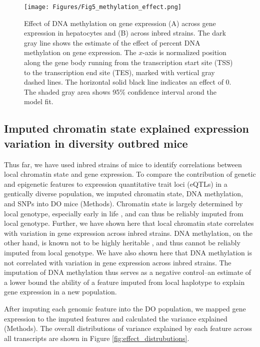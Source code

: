 \documentclass[
  11pt,
]{article}
\begin{document}
\begin{figure}[ht!]
\texttt{[image: Figures/Fig5\_methylation\_effect.png]} 
\caption{Effect of DNA methylation on gene expression (A) across gene expression
in hepatocytes and (B) across inbred strains. The dark gray line shows the
estimate of the effect of percent DNA methylation on gene expression. The 
$x$-axis is normalized position along the gene body running from the 
transcription start site (TSS) to the transcription end site (TES), 
marked with vertical gray dashed lines. The horizontal solid black 
line indicates an effect of 0. The shaded gray area shows 95\% 
confidence interval arond the model fit.}
\label{fig:DNA_methylation_effect}
\end{figure}

\hypertarget{imputed-chromatin-state-explained-expression-variation-in-diversity-outbred-mice}{%
\subsection{Imputed chromatin state explained expression variation in
diversity outbred
mice}\label{imputed-chromatin-state-explained-expression-variation-in-diversity-outbred-mice}}

Thus far, we have used inbred strains of mice to identify correlations
between local chromatin state and gene expression. To compare the
contribution of genetic and epigenetic features to expression
quantitative trait loci (eQTLs) in a gentically diverse population, we
imputed chromatin state, DNA methylation, and SNPs into DO mice
(Methods). Chromatin state is largely determined by local genotype,
especially early in life \citep{pmid16009939}, and can thus be reliably
imputed from local genotype. Further, we have shown here that local
chromatin state correlates with variation in gene expression across
inbred strains. DNA methylation, on the other hand, is known not to be
highly heritable \citep{pmid33931130}, and thus cannot be reliably
imputed from local genotype. We have also shown here that DNA
methylation is not correlated with variation in gene expression across
inbred strains. The imputation of DNA methylation thus serves as a
negative control--an estimate of a lower bound the ability of a feature
imputed from local haplotype to explain gene expression in a new
population.

After imputing each genomic feature into the DO population, we mapped
gene expression to the imputed features and calculated the variance
explained (Methods). The overall distributions of variance explained by
each feature across all transcripts are shown in Figure
\ref{fig:effect_distrubutions}.
\end{document}
